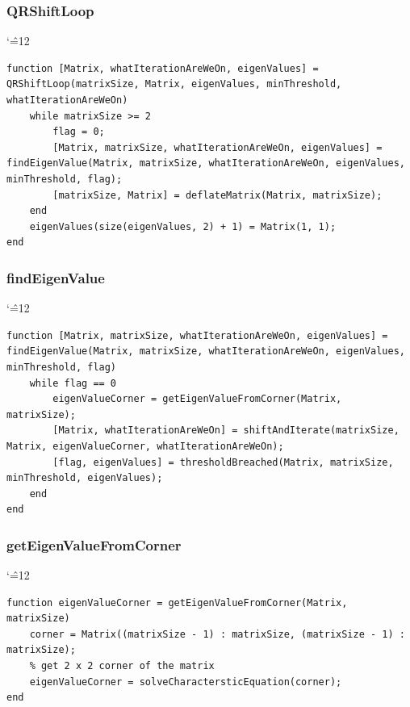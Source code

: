 \documentclass[12pt]{report}
\newenvironment{simplechar}{%
   \catcode`\^=12
}{}
\begin{document}
\subsubsection{QRShiftLoop}
\begin{simplechar}
\begin{lstlisting}
function [Matrix, whatIterationAreWeOn, eigenValues] = QRShiftLoop(matrixSize, Matrix, eigenValues, minThreshold, whatIterationAreWeOn)
    while matrixSize >= 2
        flag = 0;
        [Matrix, matrixSize, whatIterationAreWeOn, eigenValues] = findEigenValue(Matrix, matrixSize, whatIterationAreWeOn, eigenValues, minThreshold, flag);
        [matrixSize, Matrix] = deflateMatrix(Matrix, matrixSize);
    end
    eigenValues(size(eigenValues, 2) + 1) = Matrix(1, 1);
end
\end{lstlisting}
\end{simplechar}

\subsubsection{findEigenValue}
\begin{simplechar}
\begin{lstlisting}
function [Matrix, matrixSize, whatIterationAreWeOn, eigenValues] = findEigenValue(Matrix, matrixSize, whatIterationAreWeOn, eigenValues, minThreshold, flag)
    while flag == 0
        eigenValueCorner = getEigenValueFromCorner(Matrix, matrixSize);
        [Matrix, whatIterationAreWeOn] = shiftAndIterate(matrixSize, Matrix, eigenValueCorner, whatIterationAreWeOn);
        [flag, eigenValues] = thresholdBreached(Matrix, matrixSize, minThreshold, eigenValues);
    end
end

\end{lstlisting}
\end{simplechar}

\subsubsection{getEigenValueFromCorner}
\begin{simplechar}
\begin{lstlisting}
function eigenValueCorner = getEigenValueFromCorner(Matrix, matrixSize)
    corner = Matrix((matrixSize - 1) : matrixSize, (matrixSize - 1) : matrixSize);
    % get 2 x 2 corner of the matrix
    eigenValueCorner = solveCharactersticEquation(corner);
end

\end{lstlisting}
\end{simplechar}
\end{document}
